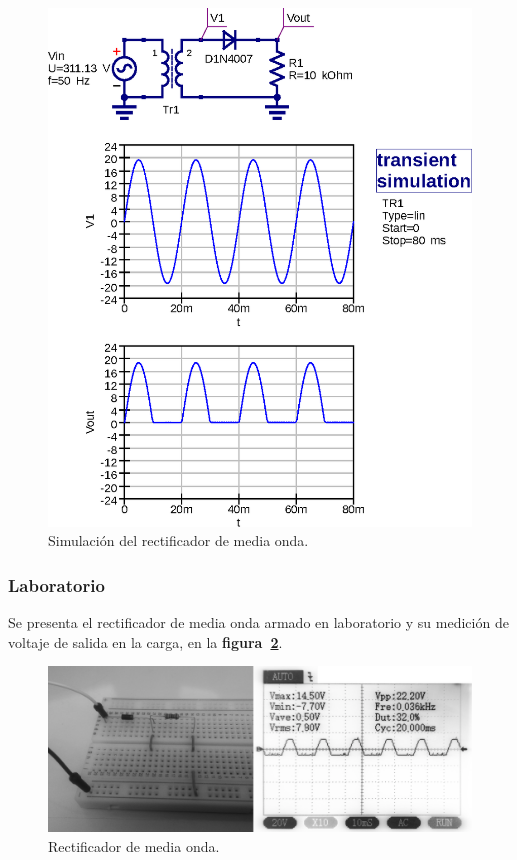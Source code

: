 \begin{figure}[!h]
\centering
\includegraphics[scale=0.75]{simulacion/02.media_onda1.eps}
\caption{Simulación del rectificador de media onda.}
\label{simulacion02}
\end{figure}

\subsubsection{Laboratorio}
Se presenta el rectificador de media onda armado en laboratorio y su medición
de voltaje de salida en la carga, en la \textbf{figura~\ref{laboratorio04}}.

\begin{figure}[!h]
\centering
\includegraphics[scale=0.28]{fotos/02.media_onda1.eps}
\caption{Rectificador de media onda.}
\label{laboratorio04}
\end{figure}

